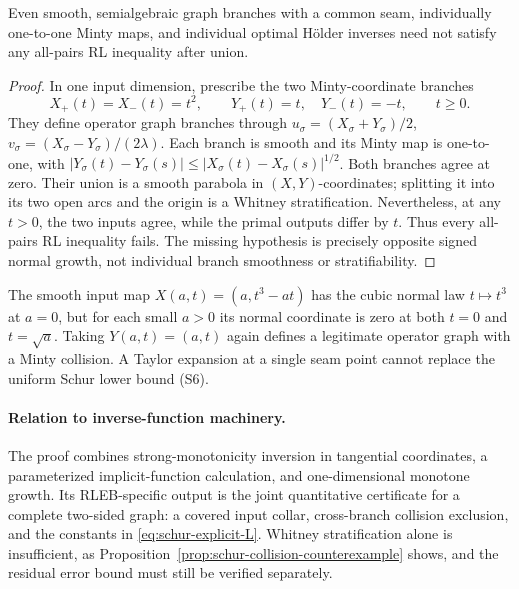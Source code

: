 \begin{proposition}
\label{prop:schur-collision-counterexample}
Even smooth, semialgebraic graph branches with a common seam, individually
one-to-one Minty maps, and individual optimal H\"older inverses need not
satisfy any all-pairs RL inequality after union.
\end{proposition}
\begin{proof}
In one input dimension, prescribe the two Minty-coordinate branches
\[
 X_+(t)=X_-(t)=t^2,\qquad
 Y_+(t)=t,\quad Y_-(t)=-t,\qquad t\ge0.
\]
They define operator graph branches through
\(u_\sigma=(X_\sigma+Y_\sigma)/2\),
\(v_\sigma=(X_\sigma-Y_\sigma)/(2\lambda)\).
Each branch is smooth and its Minty map is one-to-one, with
\(|Y_\sigma(t)-Y_\sigma(s)|\le|X_\sigma(t)-X_\sigma(s)|^{1/2}\).
Both branches agree at zero.  Their union is a smooth parabola in
\((X,Y)\)-coordinates; splitting it into its two open arcs and the
origin is a Whitney stratification.  Nevertheless, at any \(t>0\),
the two inputs agree, while the primal outputs differ by \(t\).
Thus every all-pairs RL inequality fails.  The missing hypothesis is
precisely opposite signed normal growth, not individual branch
smoothness or stratifiability.
\end{proof}

\begin{remark}
The smooth input map
\(X(a,t)=(a,t^3-at)\) has the cubic normal law \(t\mapsto t^3\)
at \(a=0\), but for each small \(a>0\) its normal coordinate is zero
at both \(t=0\) and \(t=\sqrt a\).  Taking
\(Y(a,t)=(a,t)\) again defines a legitimate operator graph with a
Minty collision.  A Taylor expansion at a single seam point cannot
replace the uniform Schur lower bound (S6).
\end{remark}

\paragraph{Relation to inverse-function machinery.}
The proof combines strong-monotonicity inversion in tangential coordinates,
a parameterized implicit-function calculation, and one-dimensional monotone
growth.  Its RLEB-specific output is the joint quantitative certificate for a
complete two-sided graph: a covered input collar, cross-branch collision
exclusion, and the constants in \eqref{eq:schur-explicit-L}.  Whitney
stratification alone is insufficient, as
Proposition~\ref{prop:schur-collision-counterexample} shows, and the residual
error bound must still be verified separately.

